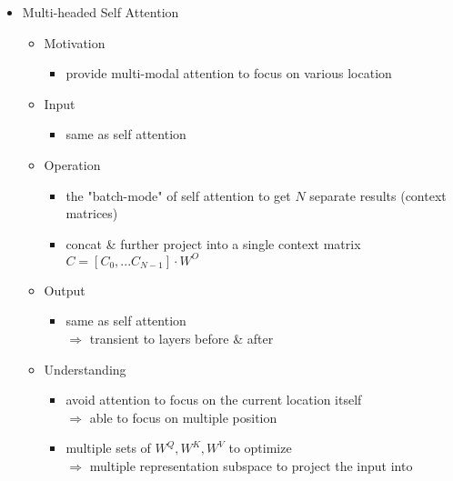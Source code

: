 \begin{itemize}
\item Multi-headed Self Attention
	\begin{itemize}
	\item Motivation
		\begin{itemize}
		\item provide multi-modal attention to focus on various location
		\end{itemize}
	\item Input
		\begin{itemize}
		\item same as self attention
		\end{itemize}
	\item Operation
		\begin{itemize}
		\item the "batch-mode" of self attention to get $N$ separate results (context matrices)
		\item concat \& further project into a single context matrix $C = [C_0, ...C_{N-1}] \cdot W^O$
		\end{itemize}
	\item Output
		\begin{itemize}
		\item same as self attention \\
		$\Rightarrow$ transient to layers before \& after
		\end{itemize}
	\item Understanding
		\begin{itemize}
		\item avoid attention to focus on the current location itself \\
		$\Rightarrow$ able to focus on multiple position
		\item multiple sets of $W^Q, W^K, W^V$ to optimize \\
		$\Rightarrow$ multiple representation subspace to project the input into
		\end{itemize}
	\end{itemize}


\end{itemize}
